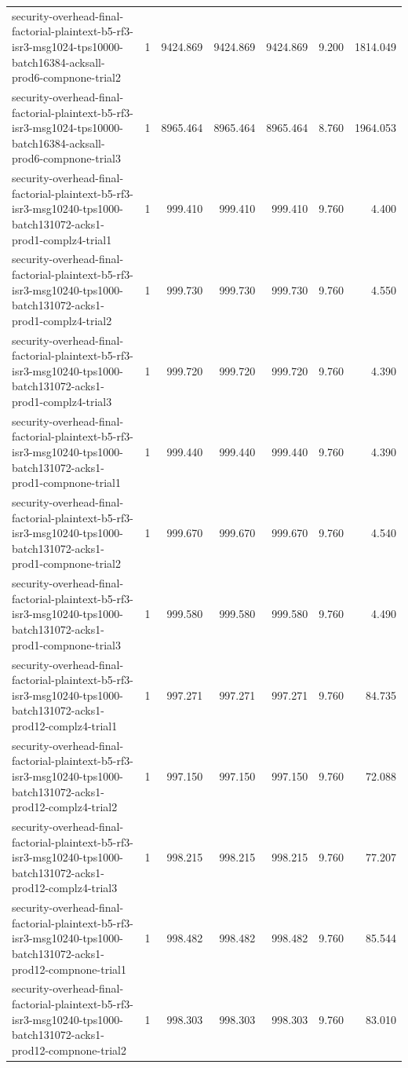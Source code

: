 \begin{tabular}{lrrrrrr}
security-overhead-final-factorial-plaintext-b5-rf3-isr3-msg1024-tps10000-batch16384-acksall-prod6-compnone-trial2 & 1 & 9424.869 & 9424.869 & 9424.869 & 9.200 & 1814.049 \\
security-overhead-final-factorial-plaintext-b5-rf3-isr3-msg1024-tps10000-batch16384-acksall-prod6-compnone-trial3 & 1 & 8965.464 & 8965.464 & 8965.464 & 8.760 & 1964.053 \\
security-overhead-final-factorial-plaintext-b5-rf3-isr3-msg10240-tps1000-batch131072-acks1-prod1-complz4-trial1 & 1 & 999.410 & 999.410 & 999.410 & 9.760 & 4.400 \\
security-overhead-final-factorial-plaintext-b5-rf3-isr3-msg10240-tps1000-batch131072-acks1-prod1-complz4-trial2 & 1 & 999.730 & 999.730 & 999.730 & 9.760 & 4.550 \\
security-overhead-final-factorial-plaintext-b5-rf3-isr3-msg10240-tps1000-batch131072-acks1-prod1-complz4-trial3 & 1 & 999.720 & 999.720 & 999.720 & 9.760 & 4.390 \\
security-overhead-final-factorial-plaintext-b5-rf3-isr3-msg10240-tps1000-batch131072-acks1-prod1-compnone-trial1 & 1 & 999.440 & 999.440 & 999.440 & 9.760 & 4.390 \\
security-overhead-final-factorial-plaintext-b5-rf3-isr3-msg10240-tps1000-batch131072-acks1-prod1-compnone-trial2 & 1 & 999.670 & 999.670 & 999.670 & 9.760 & 4.540 \\
security-overhead-final-factorial-plaintext-b5-rf3-isr3-msg10240-tps1000-batch131072-acks1-prod1-compnone-trial3 & 1 & 999.580 & 999.580 & 999.580 & 9.760 & 4.490 \\
security-overhead-final-factorial-plaintext-b5-rf3-isr3-msg10240-tps1000-batch131072-acks1-prod12-complz4-trial1 & 1 & 997.271 & 997.271 & 997.271 & 9.760 & 84.735 \\
security-overhead-final-factorial-plaintext-b5-rf3-isr3-msg10240-tps1000-batch131072-acks1-prod12-complz4-trial2 & 1 & 997.150 & 997.150 & 997.150 & 9.760 & 72.088 \\
security-overhead-final-factorial-plaintext-b5-rf3-isr3-msg10240-tps1000-batch131072-acks1-prod12-complz4-trial3 & 1 & 998.215 & 998.215 & 998.215 & 9.760 & 77.207 \\
security-overhead-final-factorial-plaintext-b5-rf3-isr3-msg10240-tps1000-batch131072-acks1-prod12-compnone-trial1 & 1 & 998.482 & 998.482 & 998.482 & 9.760 & 85.544 \\
security-overhead-final-factorial-plaintext-b5-rf3-isr3-msg10240-tps1000-batch131072-acks1-prod12-compnone-trial2 & 1 & 998.303 & 998.303 & 998.303 & 9.760 & 83.010 \\

\end{tabular}
